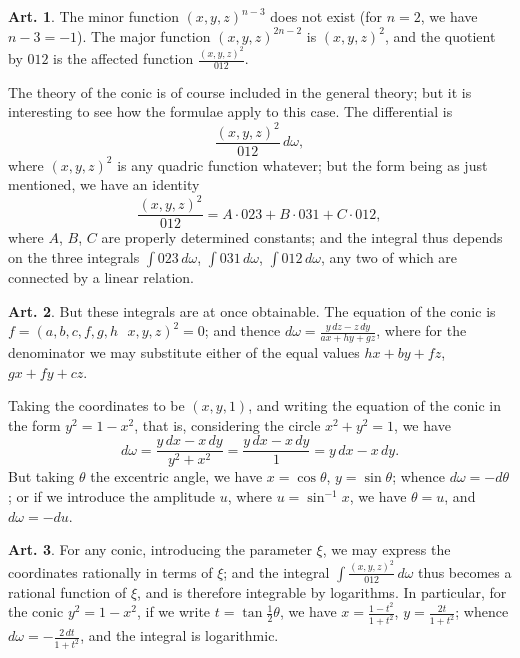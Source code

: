 \documentclass[12pt,a4paper]{article}
\theoremstyle{definition}
\newtheorem{art}{Art.}[section]
\begin{document}
\begin{art}\label{art:91}
The minor function $(x, y, z)^{n-3}$ does not exist (for $n = 2$, we have $n - 3 = -1$). The major function $(x, y, z)^{2n-2}$ is $(x, y, z)^2$, and the quotient by $012$ is the affected function $\frac{(x, y, z)^2}{012}$.

The theory of the conic is of course included in the general theory; but it is interesting to see how the formulae apply to this case. The differential is
\[
\frac{(x, y, z)^2}{012}\,d\omega,
\]
where $(x, y, z)^2$ is any quadric function whatever; but the form being as just mentioned, we have an identity
\[
\frac{(x, y, z)^2}{012} = A \cdot 023 + B \cdot 031 + C \cdot 012,
\]
where $A$, $B$, $C$ are properly determined constants; and the integral thus depends on the three integrals $\int 023\,d\omega$, $\int 031\,d\omega$, $\int 012\,d\omega$, any two of which are connected by a linear relation.
\end{art}

\newpage
\begin{art}\label{art:92}
But these integrals are at once obtainable. The equation of the conic is $f = (a, b, c, f, g, h \,\,\,\, x, y, z)^2 = 0$; and thence $d\omega = \frac{y\,dz - z\,dy}{ax + hy + gz}$, where for the denominator we may substitute either of the equal values $hx + by + fz$, $gx + fy + cz$.

Taking the coordinates to be $(x, y, 1)$, and writing the equation of the conic in the form $y^2 = 1 - x^2$, that is, considering the circle $x^2 + y^2 = 1$, we have
\[
d\omega = \frac{y\,dx - x\,dy}{y^2 + x^2} = \frac{y\,dx - x\,dy}{1} = y\,dx - x\,dy.
\]
But taking $\theta$ the excentric angle, we have $x = \cos\theta$, $y = \sin\theta$; whence $d\omega = -d\theta$; or if we introduce the amplitude $u$, where $u = \sin^{-1}x$, we have $\theta = u$, and $d\omega = -du$.
\end{art}

\begin{art}\label{art:93}
For any conic, introducing the parameter $\xi$, we may express the coordinates rationally in terms of $\xi$; and the integral $\int \frac{(x, y, z)^2}{012}\,d\omega$ thus becomes a rational function of $\xi$, and is therefore integrable by logarithms. In particular, for the conic $y^2 = 1 - x^2$, if we write $t = \tan\frac{1}{2}\theta$, we have $x = \frac{1 - t^2}{1 + t^2}$, $y = \frac{2t}{1 + t^2}$; whence $d\omega = -\frac{2\,dt}{1 + t^2}$, and the integral is logarithmic.
\end{art}
\end{document}

